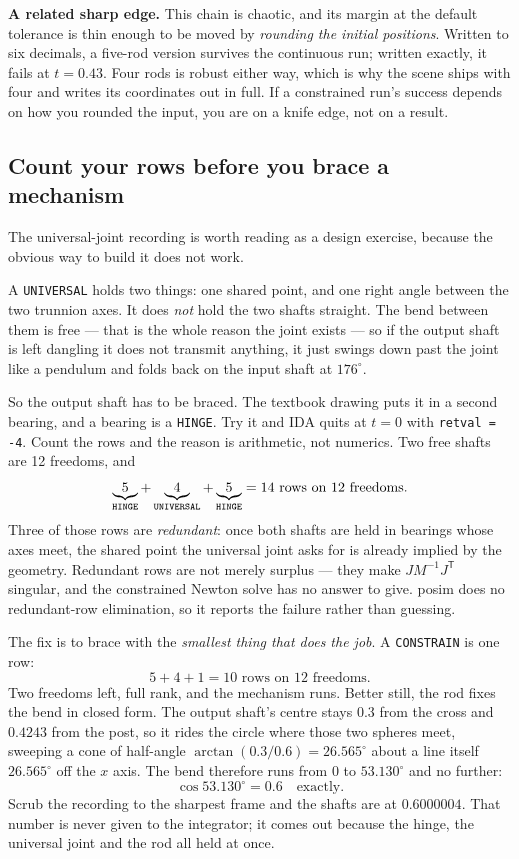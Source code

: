 \documentclass[11pt]{article}
\newcommand{\kw}[1]{\texttt{\uppercase{#1}}}
\newcommand{\code}[1]{\texttt{#1}}
\begin{document}
\textbf{A related sharp edge.} This chain is chaotic, and its margin at
the default tolerance is thin enough to be moved by \emph{rounding the
initial positions}. Written to six decimals, a five-rod version
survives the continuous run; written exactly, it fails at $t = 0.43$.
Four rods is robust either way, which is why the scene ships with four
and writes its coordinates out in full. If a constrained run's success
depends on how you rounded the input, you are on a knife edge, not on a
result.

\subsection{Count your rows before you brace a mechanism}

The universal-joint recording is worth reading as a design exercise,
because the obvious way to build it does not work.

A \kw{universal} holds two things: one shared point, and one right
angle between the two trunnion axes. It does \emph{not} hold the two
shafts straight. The bend between them is free --- that is the whole
reason the joint exists --- so if the output shaft is left dangling it
does not transmit anything, it just swings down past the joint like a
pendulum and folds back on the input shaft at $176^\circ$.

So the output shaft has to be braced. The textbook drawing puts it in a
second bearing, and a bearing is a \kw{hinge}. Try it and IDA quits at
$t=0$ with \code{retval = -4}. Count the rows and the reason is
arithmetic, not numerics. Two free shafts are 12 freedoms, and
\[
  \underbrace{5}_{\kw{hinge}} + \underbrace{4}_{\kw{universal}}
  + \underbrace{5}_{\kw{hinge}} = 14 \text{ rows on } 12 \text{ freedoms.}
\]
Three of those rows are \emph{redundant}: once both shafts are held in
bearings whose axes meet, the shared point the universal joint asks for
is already implied by the geometry. Redundant rows are not merely
surplus --- they make $J M^{-1} J^{\mathsf T}$ singular, and the
constrained Newton solve has no answer to give. posim does no
redundant-row elimination, so it reports the failure rather than
guessing.

The fix is to brace with the \emph{smallest thing that does the job}. A
\kw{constrain} is one row:
\[
  5 + 4 + 1 = 10 \text{ rows on } 12 \text{ freedoms.}
\]
Two freedoms left, full rank, and the mechanism runs. Better still, the
rod fixes the bend in closed form. The output shaft's centre stays
$0.3$ from the cross and $0.4243$ from the post, so it rides the circle
where those two spheres meet, sweeping a cone of half-angle
$\arctan(0.3/0.6) = 26.565^\circ$ about a line itself $26.565^\circ$
off the $x$ axis. The bend therefore runs from $0$ to $53.130^\circ$
and no further:
\[
  \cos 53.130^\circ = 0.6 \quad\text{exactly.}
\]
Scrub the recording to the sharpest frame and the shafts are at
$0.6000004$. That number is never given to the integrator; it comes out
because the hinge, the universal joint and the rod all held at once.
\end{document}
